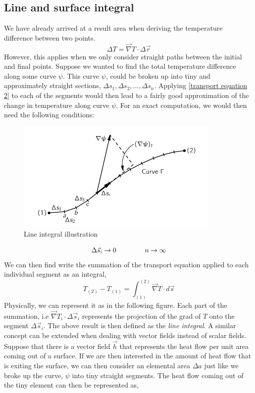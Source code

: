 \subsection{Line and surface integral}
We have already arrived at a result area when deriving the temperature difference between two points. 
\begin{equation}
	\label{transport equation 2}
	\Delta T = \vec{\nabla} T \cdot \Delta \vec{r}
\end{equation}
However, this applies when we only consider straight paths between the initial and final points. Suppose we wanted to find the total temperature difference along some curve $\psi$. This curve $\psi$, could be broken up into tiny and approximately straight sections, $\Delta s_{1}, \Delta s_{2}, ..., \Delta s_{n}$. Applying \autoref{transport equation 2} to each of the segments would then lead to a fairly good approximation of the change in temperature along curve $\psi$. For an exact computation, we would then need the following conditions: 
\begin{figure}[H]
    \centering
    \includegraphics[scale = 0.6]{math prelim/images_math prelim/line integral}
    \caption{Line integral illustration}
    \label{Line int pic}
\end{figure}
\begin{equation}
	\Delta \vec{s}_{i} \to 0 \hspace{15mm} n \to \infty 
\end{equation}
We can then find write the summation of the transport equation applied to each individual segment as an integral, 
\begin{equation}
	\label{line integral def}
	T_{(2)} - T_{(1)} = \int_{(1)}^{(2)} \vec{\nabla} T \cdot d\vec{s}
\end{equation}
Physically, we can represent it as in the following figure. Each part of the summation, i.e $\vec{\nabla} T_{i} \cdot \Delta \vec{s}_{i}$ represents the projection of the grad of $T$ onto the segment $\Delta \vec{s}_{i}$. The above result is then defined as the \emph{line integral}. A similar concept can be extended when dealing with vector fields instead of scalar fields. Suppose that there is a vector field $\vec{h}$ that represents the heat flow per unit area coming out of a surface. If we are then interested in the amount of heat flow that is exiting the surface, we can then consider an elemental area $\Delta a$ just like we broke up the curve, $\psi$ into tiny straight segments. The heat flow coming out of the tiny element can then be represented as, 
